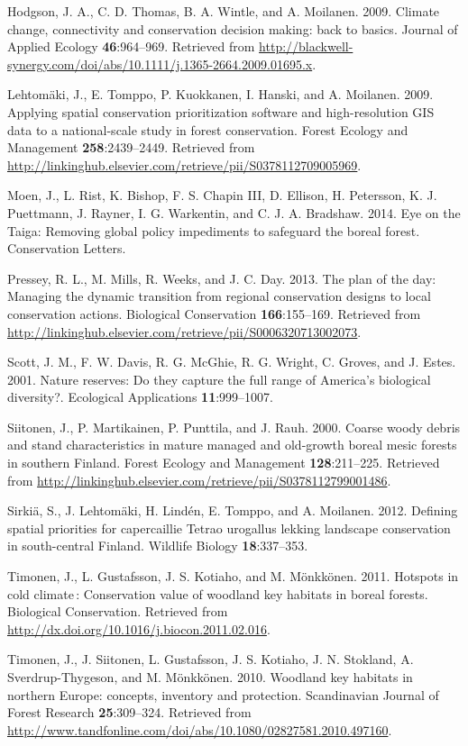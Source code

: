 \documentclass[]{article}
\begin{document}
Hodgson, J. A., C. D. Thomas, B. A. Wintle, and A. Moilanen. 2009.
Climate change, connectivity and conservation decision making: back to
basics. Journal of Applied Ecology \textbf{46}:964--969. Retrieved from
\url{http://blackwell-synergy.com/doi/abs/10.1111/j.1365-2664.2009.01695.x}.

Lehtomäki, J., E. Tomppo, P. Kuokkanen, I. Hanski, and A. Moilanen.
2009. Applying spatial conservation prioritization software and
high-resolution GIS data to a national-scale study in forest
conservation. Forest Ecology and Management \textbf{258}:2439--2449.
Retrieved from
\url{http://linkinghub.elsevier.com/retrieve/pii/S0378112709005969}.

Moen, J., L. Rist, K. Bishop, F. S. Chapin III, D. Ellison, H.
Petersson, K. J. Puettmann, J. Rayner, I. G. Warkentin, and C. J. A.
Bradshaw. 2014. Eye on the Taiga: Removing global policy impediments to
safeguard the boreal forest. Conservation Letters.

Pressey, R. L., M. Mills, R. Weeks, and J. C. Day. 2013. The plan of the
day: Managing the dynamic transition from regional conservation designs
to local conservation actions. Biological Conservation
\textbf{166}:155--169. Retrieved from
\url{http://linkinghub.elsevier.com/retrieve/pii/S0006320713002073}.

Scott, J. M., F. W. Davis, R. G. McGhie, R. G. Wright, C. Groves, and J.
Estes. 2001. Nature reserves: Do they capture the full range of
America's biological diversity?. Ecological Applications
\textbf{11}:999--1007.

Siitonen, J., P. Martikainen, P. Punttila, and J. Rauh. 2000. Coarse
woody debris and stand characteristics in mature managed and old-growth
boreal mesic forests in southern Finland. Forest Ecology and Management
\textbf{128}:211--225. Retrieved from
\url{http://linkinghub.elsevier.com/retrieve/pii/S0378112799001486}.

Sirkiä, S., J. Lehtomäki, H. Lindén, E. Tomppo, and A. Moilanen. 2012.
Defining spatial priorities for capercaillie Tetrao urogallus lekking
landscape conservation in south-central Finland. Wildlife Biology
\textbf{18}:337--353.

Timonen, J., L. Gustafsson, J. S. Kotiaho, and M. Mönkkönen. 2011.
Hotspots in cold climate : Conservation value of woodland key habitats
in boreal forests. Biological Conservation. Retrieved from
\url{http://dx.doi.org/10.1016/j.biocon.2011.02.016}.

Timonen, J., J. Siitonen, L. Gustafsson, J. S. Kotiaho, J. N. Stokland,
A. Sverdrup-Thygeson, and M. Mönkkönen. 2010. Woodland key habitats in
northern Europe: concepts, inventory and protection. Scandinavian
Journal of Forest Research \textbf{25}:309--324. Retrieved from
\url{http://www.tandfonline.com/doi/abs/10.1080/02827581.2010.497160}.
\end{document}
